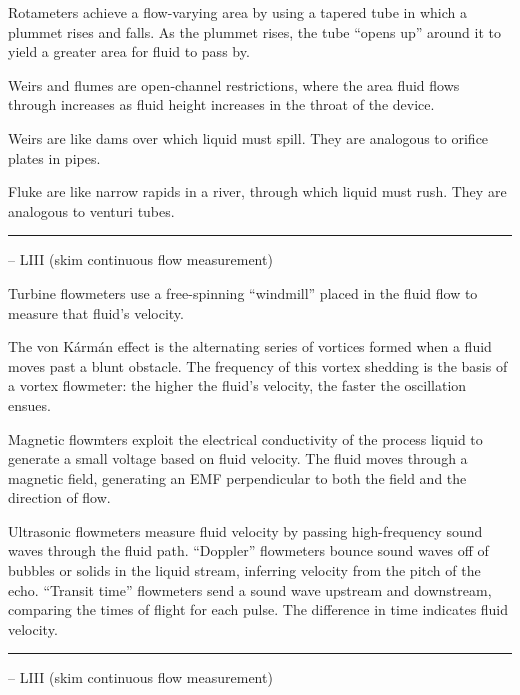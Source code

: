 Rotameters achieve a flow-varying area by using a tapered tube in which a plummet rises and falls.  As the plummet rises, the tube ``opens up'' around it to yield a greater area for fluid to pass by.

\vskip 10pt

Weirs and flumes are open-channel restrictions, where the area fluid flows through increases as fluid height increases in the throat of the device.

\vskip 10pt

Weirs are like dams over which liquid must spill.  They are analogous to orifice plates in pipes.

\vskip 10pt

Fluke are like narrow rapids in a river, through which liquid must rush.  They are analogous to venturi tubes.

\vskip 5pt \hrule \vskip 5pt  -- LIII (skim continuous flow measurement) \vskip 10pt

Turbine flowmeters use a free-spinning ``windmill'' placed in the fluid flow to measure that fluid's velocity.

\vskip 10pt

The von K\'arm\'an effect is the alternating series of vortices formed when a fluid moves past a blunt obstacle.  The frequency of this vortex shedding is the basis of a vortex flowmeter: the higher the fluid's velocity, the faster the oscillation ensues.

\vskip 10pt

Magnetic flowmters exploit the electrical conductivity of the process liquid to generate a small voltage based on fluid velocity.  The fluid moves through a magnetic field, generating an EMF perpendicular to both the field and the direction of flow.

\vskip 10pt

Ultrasonic flowmeters measure fluid velocity by passing high-frequency sound waves through the fluid path.  ``Doppler'' flowmeters bounce sound waves off of bubbles or solids in the liquid stream, inferring velocity from the pitch of the echo.  ``Transit time'' flowmeters send a sound wave upstream and downstream, comparing the times of flight for each pulse.  The difference in time indicates fluid velocity.


\vskip 5pt \hrule \vskip 5pt  -- LIII (skim continuous flow measurement) \vskip 10pt

